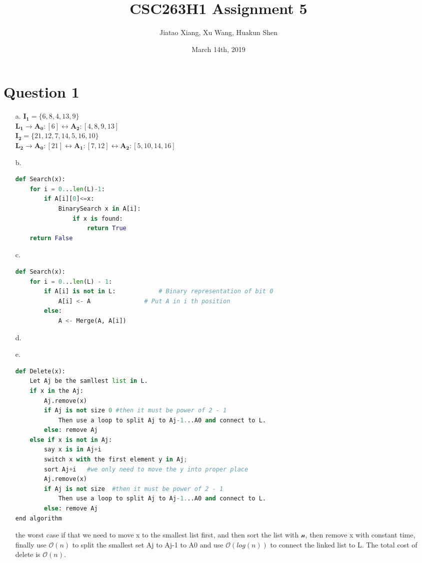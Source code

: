 \documentclass[10pt]{article}
\title{CSC263H1 Assignment 5}
\author{Jiatao Xiang, Xu Wang, Huakun Shen}
\date{March 14th, 2019}
\begin{document}
\lstset{style=mystyle}
\maketitle
\section*{Question 1}
\begin{itemize}
\item[a.]
$\boldsymbol{I_1}=\{6,8,4,13,9\}$\\
$\boldsymbol{L_1}\rightarrow \boldsymbol{A_0}:[6]\leftrightarrow \boldsymbol{A_2}:[4,8,9,13]$\\
$\boldsymbol{I_2}=\{21,12,7,14,5,16,10\}$\\
$\boldsymbol{L_2}\rightarrow \boldsymbol{A_0}:[21]\leftrightarrow \boldsymbol{A_1}:[7,12]\leftrightarrow \boldsymbol{A_2}:[5,10,14,16]$
\item[b.]
\begin{lstlisting}[language=Python]
def Search(x):
	for i = 0...len(L)-1:
		if A[i][0]<=x:
			BinarySearch x in A[i]:
				if x is found:
					return True
	return False
\end{lstlisting}
\item[c.]
\begin{lstlisting}[language=Python]
def Search(x):
	for i = 0...len(L) - 1:
		if A[i] is not in L:			# Binary representation of bit 0
			A[i] <- A				# Put A in i th position
		else:
			A <- Merge(A, A[i])
\end{lstlisting}
\item[d.]
\item[e.]
\begin{lstlisting}[language=Python]
def Delete(x):
	Let Aj be the samllest list in L.
	if x in the Aj:
		Aj.remove(x)
		if Aj is not size 0 #then it must be power of 2 - 1
			Then use a loop to split Aj to Aj-1...A0 and connect to L.
		else: remove Aj
	else if x is not in Aj:
		say x is in Aj+i
		switch x with the first element y in Aj;
		sort Aj+i   #we only need to move the y into proper place
		Aj.remove(x)
		if Aj is not size  #then it must be power of 2 - 1
			Then use a loop to split Aj to Aj-1...A0 and connect to L.
		else: remove Aj
end algorithm
\end{lstlisting}
the worst case if that we need to move x to the smallest list first, and then sort the list with $\mathcal{n}$, then remove x with constant time, finally use $\mathcal{O}(n)$ to split the smallest set  Aj to Aj-1 to A0 and use $\mathcal{O}(log(n))$ to connect the linked list to L. The total cost of delete is $\mathcal{O}(n)$.
\end{itemize}
\end{document}

